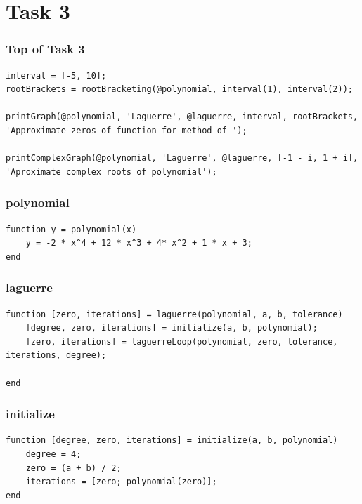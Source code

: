 \section{Task 3}

\subsubsection{Top of Task 3}
\begin{simplechar}
\begin{lstlisting}
interval = [-5, 10];
rootBrackets = rootBracketing(@polynomial, interval(1), interval(2));

printGraph(@polynomial, 'Laguerre', @laguerre, interval, rootBrackets, 'Approximate zeros of function for method of ');

printComplexGraph(@polynomial, 'Laguerre', @laguerre, [-1 - i, 1 + i], 'Aproximate complex roots of polynomial');
\end{lstlisting}
\end{simplechar}

\subsubsection{polynomial}
\begin{simplechar}
\begin{lstlisting}
function y = polynomial(x)
    y = -2 * x^4 + 12 * x^3 + 4* x^2 + 1 * x + 3;
end
\end{lstlisting}
\end{simplechar}

\subsubsection{laguerre}
\begin{simplechar}
\begin{lstlisting}
function [zero, iterations] = laguerre(polynomial, a, b, tolerance)
    [degree, zero, iterations] = initialize(a, b, polynomial);
    [zero, iterations] = laguerreLoop(polynomial, zero, tolerance, iterations, degree);

end
\end{lstlisting}
\end{simplechar}

\newpage
\subsubsection{initialize}
\begin{simplechar}
\begin{lstlisting}
function [degree, zero, iterations] = initialize(a, b, polynomial)
    degree = 4;
    zero = (a + b) / 2;
    iterations = [zero; polynomial(zero)];
end
\end{lstlisting}
\end{simplechar}


